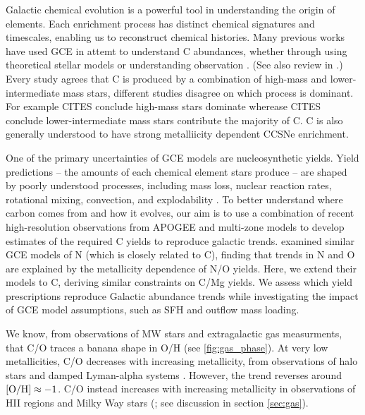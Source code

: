 \documentclass[fleqn,usenatbib]{mnras}
\newcommand{\sfh}{SFH}
\newcommand{\gce}{GCE}
\newcommand{\lims}{lower-intermediate mass stars}
\newcommand{\hms}{high-mass stars}
\begin{document}


Galactic chemical evolution is a powerful tool in understanding the origin of elements. 
Each enrichment process has distinct chemical signatures and timescales, enabling us to reconstruct chemical histories.
Many previous works have used GCE in attemt to understand C abundances, whether through using theoretical stellar models \citep{DTS78, prantzos+18, chiappini+03} 
or understanding  observation \citep{tinsley79, HEK00, BF06, rybizki+17, berg+19, KKL20}.
(See also review in \citealt{romano22}.)
%
Every study agrees that C is produced by a combination of high-mass and \lims{}, different studies disagree on which process is dominant. 
For example CITES conclude \hms{} dominate wherease CITES conclude \lims{} contribute the majority of C.
C is also generally understood to have strong metalliicity dependent CCSNe enrichment. 


One of the primary uncertainties of GCE models are nucleosynthetic yields. Yield predictions -- the amounts of each chemical element stars produce --
are shaped by poorly understood processes, including mass loss, nuclear reaction rates, rotational mixing, convection, and explodability \citep{romano+10,KL14,ventura+13, LC18, emily+21}.
To better understand where carbon comes from and how it evolves, our aim is to use a combination of recent high-resolution observations from APOGEE and multi-zone models to develop estimates of the required C yields to reproduce galactic trends.
\cite{james+23} examined similar \gce{} models of N (which is closely related to C), finding that trends in N and O are explained by the metallicity dependence of N/O yields. Here, we extend their models to C, deriving similar constraints on C/Mg yields. We assess which yield prescriptions reproduce Galactic abundance trends while investigating the impact of \gce{} model assumptions, such as \sfh{} and outflow mass loading.


We know, from observations of MW stars and extragalactic gas measurments, that C/O traces a banana shape in O/H (see \ref{fig:gas_phase}). 
At very low metallicities, C/O decreases with increasing metallicity, from observations of halo stars and damped Lyman-alpha systems\footnotemark{} \citep{nissen+14, cooke+17, fabbian+09}. 
%
However, the trend reverses around $[{\rm O/H}]\approx-1$\footnotemark{}. 
C/O instead increases with increasing metallicity in observations of HII regions and Milky Way stars (\citealt{berg+19}; see discussion in section \ref{sec:gas}).
\end{document}
